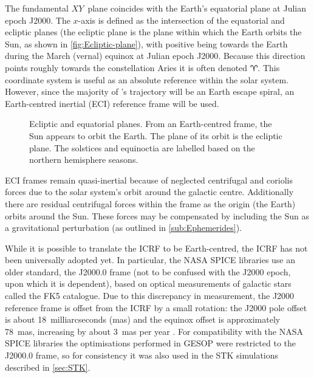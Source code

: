 The fundamental $XY$~plane coincides with the Earth's equatorial plane at Julian epoch J2000. The $x$-axis is defined as the intersection of the equatorial and ecliptic planes (the ecliptic plane is the plane within which the Earth orbits the Sun, as shown in \autoref{fig:Ecliptic-plane}), with positive being towards the Earth during the March (vernal) equinox at Julian epoch J2000. Because this direction points roughly towards the constellation Aries it is often denoted $\Aries$. This coordinate system is useful as an absolute reference within the solar system. However, since the majority of \BW's trajectory will be an Earth escape spiral, an Earth-centred inertial (ECI) reference frame will be used.

\begin{figure}
\centering
\def\svgwidth{\figurewidth}

\caption{Ecliptic and equatorial planes. From an Earth-centred frame, the Sun appears to orbit the Earth. The plane of its orbit is the ecliptic plane. %
The solstices and equinoctia are labelled based on the northern hemisphere seasons.} \label{fig:Ecliptic-plane}
\end{figure}

ECI frames remain quasi-inertial because of neglected centrifugal and coriolis forces due to the solar system's orbit around the galactic centre. Additionally there are residual centrifugal forces within the frame as the origin (the Earth) orbits around the Sun. These forces may be compensated by including the Sun as a gravitational perturbation (as outlined in \autoref{sub:Ephemerides}).

While it is possible to translate the ICRF to be Earth-centred, the ICRF has not been universally adopted yet. In particular, the NASA SPICE libraries use an older standard, the J2000.0 frame (not to be confused with the J2000 epoch, upon which it is dependent), based on optical measurements of galactic stars called the FK5 catalogue. Due to this discrepancy in measurement, the J2000 reference frame is offset from the ICRF  by a small rotation: the J2000 pole offset is about 18~milliarcseconds (mas) and the equinox offset is approximately 78~mas, increasing by about 3~mas per year \parencite{Gontier2002}. 
For compatibility with the NASA SPICE libraries the optimisations performed in GESOP were restricted to the J2000.0 frame, so for consistency it was also used in the STK simulations described in \autoref{sec:STK}.

